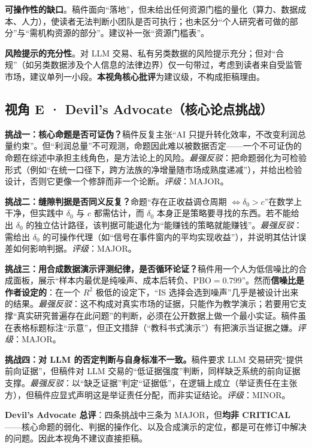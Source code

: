 \documentclass[11pt,a4paper]{ctexart}
\begin{document}
\textbf{可操作性的缺口}。稿件面向“落地”，但未给出任何资源门槛的量化（算力、数据成本、人力），使读者无法判断小团队是否可执行；也未区分“个人研究者可做的部分”与“需机构资源的部分”。建议补一张“资源门槛表”。

\textbf{风险提示的充分性}。对 LLM 交易、私有另类数据的风险提示充分；但对“合规”（如另类数据涉及个人信息的法律边界）仅一句带过，考虑到读者来自受监管市场，建议单列一小段。\textbf{本视角核心批评}为建议级，不构成拒稿理由。

\subsection{视角 E · Devil's Advocate（核心论点挑战）}

\textbf{挑战一：核心命题是否可证伪？}稿件反复主张“AI 只提升转化效率，不改变利润总量约束”。但“利润总量”不可观测，命题因此难以被数据否定——一个不可证伪的命题在综述中承担主线角色，是方法论上的风险。\emph{最强反驳}：把命题弱化为可检验形式（例如“在统一口径下，跨方法族的净增量随市场成熟度递减”），并给出检验设计，否则它更像一个修辞而非一个论断。\emph{评级}：MAJOR。

\textbf{挑战二：缝隙判据是否同义反复？}命题“存在正收益调仓周期 $\iff \delta_0>c$”在数学上干净，但实践中 $\delta_0$ 与 $c$ 都需估计，而 $\delta_0$ 本身正是策略要寻找的东西。若不能给出 $\delta_0$ 的独立估计路径，该判据可能退化为“能赚钱的策略就能赚钱”。\emph{最强反驳}：需给出 $\delta_0$ 的可操作代理（如“信号在事件窗内的平均实现收益”），并说明其估计误差如何影响判据。\emph{评级}：MAJOR。

\textbf{挑战三：用合成数据演示评测纪律，是否循环论证？}稿件用一个人为低信噪比的合成面板，展示“样本内最优是纯噪声、成本后转负、PBO$=0.799$”。然而\textbf{信噪比是作者设定的}：在一个 $R^2$ 极低的设定下，“IS 选择会选到噪声”几乎是被设计出来的结果。\emph{最强反驳}：这不构成对真实市场的证据，只能作为教学演示；若要用它支撑“真实研究普遍存在此问题”的判断，必须在公开数据上做一个最小实证。稿件虽在表格标题标注“示意”，但正文措辞（“教科书式演示”）有把演示当证据之嫌。\emph{评级}：MAJOR。

\textbf{挑战四：对 LLM 的否定判断与自身标准不一致。}稿件要求 LLM 交易研究“提供前向证据”，但稿件对 LLM 交易的“低证据强度”判断，同样缺乏系统的前向证据支撑。\emph{最强反驳}：以“缺乏证据”判定“证据低”，在逻辑上成立（举证责任在主张方），但稿件应显式声明这是举证责任分配，而非实证结论。\emph{评级}：MINOR。

\textbf{Devil's Advocate 总评}：四条挑战中三条为 MAJOR，但\textbf{均非 CRITICAL}——核心命题的弱化、判据的操作化、以及合成演示的定位，都是可在修订中解决的问题。因此本视角不建议直接拒稿。
\end{document}
